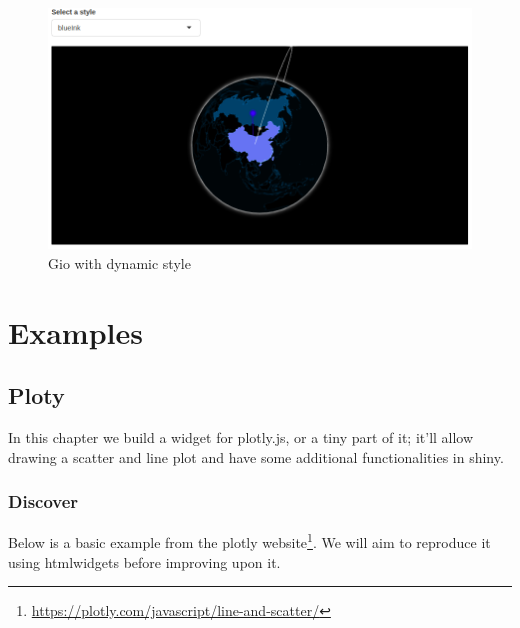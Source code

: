 \documentclass[
]{krantz}
\renewcommand{\href}[2]{#2\footnote{\url{#1}}}
\begin{document}
\begin{figure}
\centering
\includegraphics{images/gio-shiny-style.png}
\caption{Gio with dynamic style}
\end{figure}

\hypertarget{part-examples}{%
\part{Examples}\label{part-examples}}

\hypertarget{ploty}{%
\chapter{Ploty}\label{ploty}}

In this chapter we build a widget for plotly.js, or a tiny part of it; it'll allow drawing a scatter and line plot and have some additional functionalities in shiny.

\hypertarget{discover}{%
\section*{Discover}\label{discover}}


Below is a basic example from the \href{https://plotly.com/javascript/line-and-scatter/}{plotly website}. We will aim to reproduce it using htmlwidgets before improving upon it.
\end{document}

